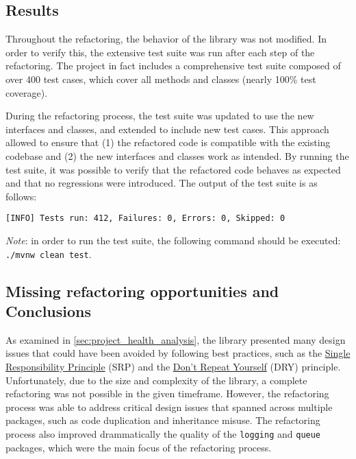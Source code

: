 
\subsection{Results}

Throughout the refactoring, the behavior of the library was not modified. In order to verify this, the extensive test suite was run after each step of the refactoring. The project in fact includes a comprehensive test suite composed of over 400 test cases, which cover all methods and classes (nearly 100\% test coverage).

During the refactoring process, the test suite was updated to use the new interfaces and classes, and extended to include new test cases. This approach allowed to ensure that (1) the refactored code is compatible with the existing codebase and (2) the new interfaces and classes work as intended. By running the test suite, it was possible to verify that the refactored code behaves as expected and that no regressions were introduced. The output of the test suite is as follows:

\begin{center}
	\begin{minipage}{0.7\linewidth}
		\begin{verbatim}
[INFO] Tests run: 412, Failures: 0, Errors: 0, Skipped: 0
    \end{verbatim}
	\end{minipage}
\end{center}

\noindent \textit{Note}: in order to run the test suite, the following command should be executed: \texttt{./mvnw clean test}.

\subsection{Missing refactoring opportunities and Conclusions}

As examined in \autoref{sec:project_health_analysis}, the library presented many design issues that could have been avoided by following best practices, such as the \href{https://en.wikipedia.org/wiki/Single_responsibility_principle}{Single Responsibility Principle} (SRP) and the \href{https://en.wikipedia.org/wiki/Don%27t_repeat_yourself}{Don't Repeat Yourself} (DRY) principle. Unfortunately, due to the size and complexity of the library, a complete refactoring was not possible in the given timeframe. However, the refactoring process was able to address critical design issues that spanned across multiple packages, such as code duplication and inheritance misuse. The refactoring process also improved drammatically the quality of the \texttt{logging} and \texttt{queue} packages, which were the main focus of the refactoring process.

